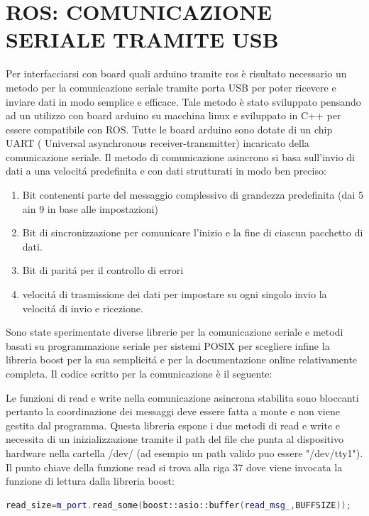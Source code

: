 \documentclass[a4paper]{article}
\begin{document}
\section{ROS: COMUNICAZIONE SERIALE TRAMITE USB}
Per interfacciarsi con board quali arduino tramite ros è risultato necessario un metodo per la comunicazione seriale tramite porta USB per poter ricevere e inviare dati in modo semplice e efficace.
Tale metodo è stato sviluppato pensando ad un utilizzo con board arduino su macchina linux e sviluppato in C++ per essere compatibile con ROS.
Tutte le board arduino sono dotate di un chip UART ( Universal asynchronous receiver-transmitter) incaricato della comunicazione seriale.
Il metodo di comunicazione asincrono si basa sull'invio di dati a una velocitá predefinita e con dati strutturati in modo ben preciso:
\begin{enumerate} 
    \item Bit contenenti parte del messaggio complessivo di grandezza predefinita (dai 5 ain 9 in base alle impostazioni)
    \item Bit di sincronizzazione per comunicare l'inizio e la fine di ciascun pacchetto di dati.
    \item Bit di paritá per il controllo di errori
    \item velocitá di trasmissione dei dati per impostare su ogni singolo invio la velocitá di invio e ricezione.
\end{enumerate}
Sono state sperimentate diverse librerie per la comunicazione seriale e metodi basati su programmazione seriale per sistemi POSIX per scegliere infine la libreria boost per la sua semplicitá e per la documentazione online relativamente completa.
Il codice scritto per la comunicazione è il seguente:


Le funzioni di read e write nella comunicazione asincrona stabilita sono bloccanti pertanto la coordinazione dei messaggi deve essere fatta a monte e non viene gestita dal programma.
Questa libreria espone i due metodi di read e write e necessita di un inizializzazione tramite il path del file che punta al dispositivo hardware nella cartella /dev/ (ad esempio un path valido puo essere "/dev/tty1").
Il punto chiave della funzione read si trova alla riga 37 dove viene invocata la funzione di lettura dalla libreria boost:

\begin{lstlisting}[language=C++,firstnumber=37]
read_size=m_port.read_some(boost::asio::buffer(read_msg_,BUFFSIZE));
\end{lstlisting}
\end{document}
